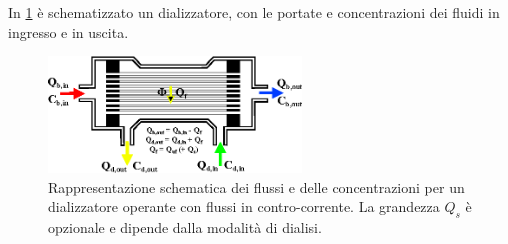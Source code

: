 In \figurename\ref{dialyzer} è schematizzato un dializzatore, con le portate e concentrazioni dei fluidi in ingresso e in uscita.
\begin{figure}[htb]
	\centering
		\includegraphics[width=0.6\textwidth]{immagini/dialyzer.eps}
		\caption{Rappresentazione schematica dei flussi e delle concentrazioni per un dializzatore operante con flussi in contro-corrente. La grandezza $Q_s$ è opzionale e dipende dalla modalità di dialisi.}\label{dialyzer}
\end{figure}


